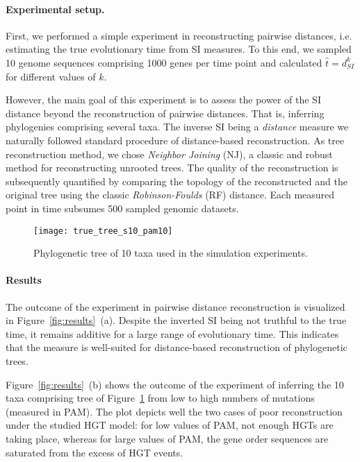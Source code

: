 \documentclass[9pt,english,utf8]{article}
\begin{document}
\paragraph{Experimental setup.}
First, we performed a simple experiment in reconstructing pairwise distances,
i.e.  estimating the true evolutionary time from SI measures. To this end, we
sampled 10 genome sequences comprising 1000 genes per time point and calculated
$\hat t = d_{SI}^k$ for different values of $k$.  

However, the main goal of this experiment is to assess the power of the SI
distance beyond the reconstruction of pairwise distances. That is, inferring
phylogenies comprising several taxa. The inverse SI being a \emph{distance}
measure we naturally followed standard procedure of distance-based
reconstruction. As tree reconstruction method, we chose \emph{Neighbor
Joining} (NJ), a classic and robust method for reconstructing unrooted trees.
The quality of the reconstruction is subsequently quantified by comparing the
topology of the reconstructed and the original tree using the classic
\emph{Robinson-Foulds} (RF) distance. Each measured point in time subsumes 500
sampled genomic datasets. 

\begin{figure}[tb]
    \centering \texttt{[image: true\_tree\_s10\_pam10]}

    \caption{Phylogenetic tree of 10 taxa used in the simulation experiments.}
    \label{fig:tree}
\end{figure}

\paragraph{Results} The outcome of the experiment in pairwise distance
reconstruction is visualized in Figure~\ref{fig:results}~(a). Despite the
inverted SI being not truthful to the true time, it remains additive for a
large range of evolutionary time. This indicates that the measure is
well-suited for distance-based reconstruction of phylogenetic trees. 

Figure~\ref{fig:results}~(b) shows the outcome of the experiment of inferring
the 10 taxa comprising tree of Figure~\ref{fig:tree} from low to high numbers
of mutations (measured in PAM). The plot depicts well the two cases of poor
reconstruction under the studied HGT model: for low values of PAM, not enough
HGTs are taking place, whereas for large values of PAM, the gene order
sequences are saturated from the excess of HGT events. 
\end{document}
